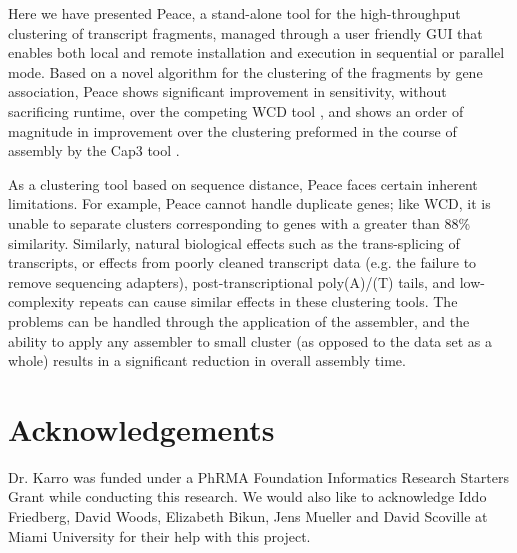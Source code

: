 \documentclass[a4,center,fleqn]{NAR}
\begin{document}
Here we have presented {\sc Peace}, a stand-alone tool for the
high-throughput clustering of transcript fragments, managed through a
user friendly GUI that enables both local and remote installation and
execution in sequential or parallel mode.  Based on a novel algorithm
for the clustering of the fragments by gene association, {\sc Peace}
shows significant improvement in sensitivity, without sacrificing runtime,
over the competing {\sc WCD} tool \cite{Hazelhurst08a}, and shows an
order of magnitude in improvement over the clustering preformed in the
course of assembly by the {\sc Cap3} tool \cite{Huang99}.

As a clustering tool based on sequence distance, {\sc Peace} faces
certain inherent limitations. For example, {\sc Peace} cannot handle
duplicate genes; like {\sc WCD}, it is unable to separate clusters
corresponding to genes with a greater than 88\% similarity.
Similarly, natural biological effects such as the trans-splicing of
transcripts, or effects from poorly cleaned transcript data (e.g. the
failure to remove sequencing adapters), post-transcriptional
poly(A)/(T) tails, and low-complexity repeats can cause similar
effects in these clustering tools.  The problems can be handled
through the application of the assembler, and the ability to apply any
assembler to small cluster (as opposed to the data set as a whole)
results in a significant reduction in overall assembly time.

\section{Acknowledgements}

Dr. Karro was funded under a PhRMA Foundation Informatics Research
Starters Grant while conducting this research.  We would also like to
acknowledge Iddo Friedberg, David Woods, Elizabeth Bikun, Jens Mueller and David
Scoville at Miami University for their help with this project.

\vspace{3mm}


\end{document}

